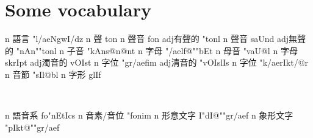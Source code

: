 \section{Some vocabulary}
\begin{tegzkD}{8}
         {n}  {語言}      {}{"l{/ae}NgwI/dz}    {}{}             {n}  {聲}        {}{ton}                {}{}  
            {n}  {聲音}      {}{fon}               {}{}            {adj}{有聲的}    {}{"tonl}              {}{}  
            {n}  {聲音}      {}{saUnd}             {}{}         {adj}{無聲的}    {}{"nAn""tonl}         {}{}  
        {n}  {子音}      {}{"kAns@n@nt}        {}{}         {n}  {字母}      {}{{"/ae}lf@""bEt}     {}{}  
            {n}  {母音}      {}{"vaU@l}            {}{}           {n}  {字母}      {}{skrIpt}             {}{}  
           {adj}{濁音的}    {}{vOIst}             {}{}         {n}  {字位}      {}{"gr{/ae}fim}        {}{}  
        {adj}{清音的}    {}{"vOIslIs}          {}{}        {n}  {字位}      {}{"k{/ae}rIkt{/@r}}   {}{}  
         {n}  {音節}      {}{"sIl@bl}           {}{}            {n}  {字形}      {}{glIf}               {}{}  
\end{tegzkD}%
\\
\begin{tegzk}[-1]
       {n}  {語音系}    {}{fo"nEtIcs}         {}{}   
         {n}  {音素/音位} {}{"fonim}            {}{}   
       {n}  {形意文字}  {}{I"dI@""gr{/ae}f}    {}{}  
      {n}  {象形文字}  {}{"pIkt@""gr{/ae}f}   {}{}  
\end{tegzk}


